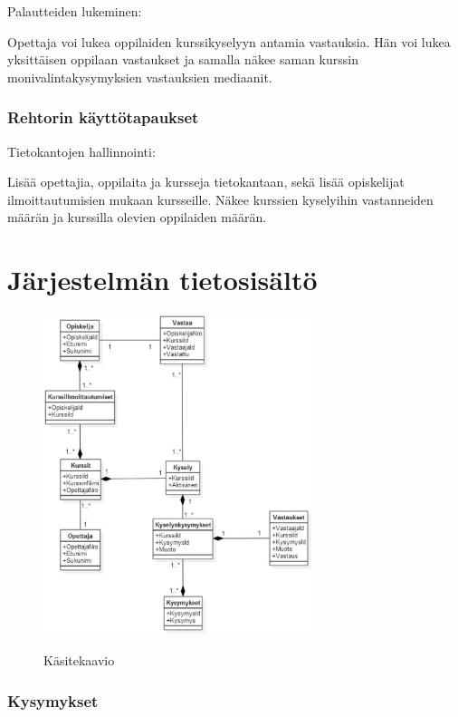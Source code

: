 \documentclass[12pt,twoside,a4paper,leqno,titlepage]{article}
\begin{document}
Palautteiden lukeminen:

Opettaja voi lukea oppilaiden kurssikyselyyn antamia vastauksia. Hän voi lukea
yksittäisen oppilaan vastaukset ja samalla näkee saman kurssin monivalintakysymyksien
vastauksien mediaanit.

\subsubsection*{Rehtorin käyttötapaukset}

Tietokantojen hallinnointi:

Lisää opettajia, oppilaita ja kursseja tietokantaan, sekä lisää opiskelijat
ilmoittautumisien mukaan kursseille. Näkee kurssien kyselyihin vastanneiden
määrän ja kurssilla olevien oppilaiden määrän.

\section{Järjestelmän tietosisältö}

\begin{figure}[!h]
  \centering
  \includegraphics[width=0.7\textwidth]{kasitekaavio.eps}\\
  \caption{Käsitekaavio}
\end{figure}


\subsubsection*{Kysymykset}
\end{document}
